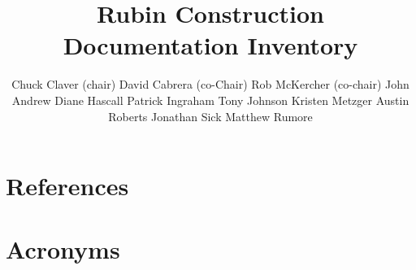 \documentclass[SE,authoryear,toc]{lsstdoc}
\title{Rubin Construction Documentation Inventory}
\author{%
Chuck Claver (chair)
David Cabrera (co-Chair)
Rob McKercher (co-chair)
John Andrew
Diane Hascall
Patrick Ingraham
Tony Johnson
Kristen Metzger
Austin Roberts
Jonathan Sick
Matthew Rumore
}
\date{\vcsDate}
\begin{document}
\maketitle












% 

\newpage
\appendix
\section{References} \label{sec:bib}
\renewcommand{\refname}{} %


\section{Acronyms} \label{sec:acronyms}

\end{document}
